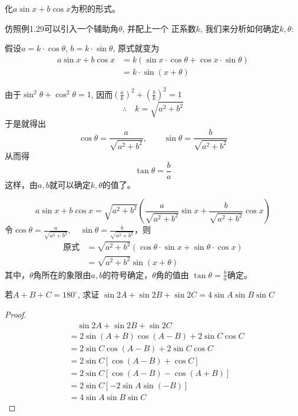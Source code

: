 \begin{example}
    化$a\sin x+b\cos x$为积的形式。
\end{example}

\begin{analyze}
仿照例1.29可以引入一个辅助角$\theta$, 并配上一个
正系数$k$, 我们来分析如何确定$k,\theta$:

假设$a=k\cdot \cos\theta$, $b=k\cdot\sin\theta$, 原式就变为
\[\begin{split}
    a\sin x+b\cos x&=k(\sin x\cdot \cos\theta+ \cos x\cdot \sin\theta)\\
    &=k\cdot \sin (x+\theta) 
\end{split}\]

由于$\sin^2\theta+\cos^2\theta=1$, 因而$\left(\frac{a}{k}\right)^2+\left(\frac{b}{k}\right)^2=1$
\[\therefore\quad k=\sqrt{a^2+b^2}\]
于是就得出
\[\cos\theta=\frac{a}{\sqrt{a^2+b^2}},\qquad  \sin\theta=\frac{b}{\sqrt{a^2+b^2}} \]
从而得
\[\tan\theta =\frac{b}{a}\]
这样，由$a,b$就可以确定$k,\theta$的值了。
\end{analyze}

\begin{solution}
\[a\sin x+b\cos x=\sqrt{a^2+b^2}\left(\frac{a}{\sqrt{a^2+b^2}}\sin x+\frac{b}{\sqrt{a^2+b^2}}\cos x\right)\]
令$\cos\theta=\frac{a}{\sqrt{a^2+b^2}},\quad  \sin\theta=\frac{b}{\sqrt{a^2+b^2}}$，则
\[\begin{split}
    \text{原式}&=\sqrt{a^2+b^2}(\cos\theta\cdot \sin x+\sin\theta \cdot \cos x)\\
&=\sqrt{a^2+b^2}\sin (x+\theta)
\end{split}\]
其中，$\theta$角所在的象限由$a,b$的符号确定，$\theta$角的值由
$\tan\theta=\frac{b}{a}$确定。
\end{solution}


\begin{example}
    若$A+B+C=180^{\circ}$, 求证
$\sin2A+\sin2B+\sin2C=4\sin A\sin B\sin C$
\end{example}

\begin{proof}
\begin{align*}
  &\quad   \sin2A+\sin2B+\sin2C\\
    &=2\sin (A+B) \cos(A-B) +2\sin C\cos C\\
    &=2\sin C\cos (A-B) +2\sin C\cos C \tag{$\sin (A+B)=\sin C$}\\
    &=2\sin C [\cos(A-B)+\cos C]\\
    &=2\sin C [\cos(A-B)-\cos(A+B)]
    \tag{$\cos C=-\cos (A+B)$}\\
    &=2\sin C [-2\sin A\sin (-B)]\\
    &=4\sin A\sin B\sin C  
\end{align*}
\end{proof}

